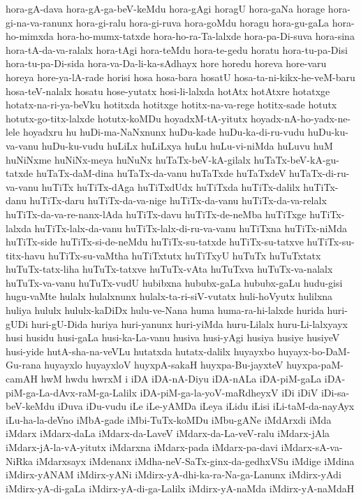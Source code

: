 {hora-gA-dava
hora-gA-ga-beV-keMdu
hora-gAgi
horagU
hora-gaNa
horage
hora-gi-na-va-ranunx
hora-gi-ralu
hora-gi-ruva
hora-goMdu
horagu
hora-gu-gaLa
hora-ho-mimxda
hora-ho-mumx-tatxde
hora-ho-ra-Ta-lalxde
hora-pa-Di-suva
hora-sina
hora-tA-da-va-ralalx
hora-tAgi
hora-teMdu
hora-te-gedu
horatu
hora-tu-pa-Disi
hora-tu-pa-Di-sida
hora-va-Da-li-ka-sAdhayx
hore
horedu
horeva
hore-varu
horeya
hore-ya-lA-rade
horisi
hosa
hosa-bara
hosatU
hosa-ta-ni-kikx-he-veM-baru
hosa-teV-nalalx
hosatu
hose-yutatx
hosi-li-lalxda
hotAtx
hotAtxre
hotatxge
hotatx-na-ri-ya-beVku
hotitxda
hotitxge
hotitx-na-va-rege
hotitx-sade
hotutx
hotutx-go-titx-lalxde
hotutx-koMDu
hoyadxM-tA-yitutx
hoyadx-nA-ho-yadx-ne-lele
hoyadxru
hu
huDi-ma-NaNxnunx
huDu-kade
huDu-ka-di-ru-vudu
huDu-ku-va-vanu
huDu-ku-vudu
huLiLx
huLiLxya
huLu
huLu-vi-niMda
huLuvu
huM
huNiNxme
huNiNx-meya
huNuNx
huTaTx-beV-kA-gilalx
huTaTx-beV-kA-gu-tatxde
huTaTx-daM-dina
huTaTx-da-vanu
huTaTxde
huTaTxdeV
huTaTx-di-ru-va-vanu
huTiTx
huTiTx-dAga
huTiTxdUdx
huTiTxda
huTiTx-dalilx
huTiTx-danu
huTiTx-daru
huTiTx-da-va-nige
huTiTx-da-vanu
huTiTx-da-va-relalx
huTiTx-da-va-re-nanx-lAda
huTiTx-davu
huTiTx-de-neMba
huTiTxge
huTiTx-lalxda
huTiTx-lalx-da-vanu
huTiTx-lalx-di-ru-va-vanu
huTiTxna
huTiTx-niMda
huTiTx-side
huTiTx-si-de-neMdu
huTiTx-su-tatxde
huTiTx-su-tatxve
huTiTx-su-titx-havu
huTiTx-su-vaMtha
huTiTxtutx
huTiTxyU
huTuTx
huTuTxtatx
huTuTx-tatx-liha
huTuTx-tatxve
huTuTx-vAta
huTuTxva
huTuTx-va-nalalx
huTuTx-va-vanu
huTuTx-vudU
hubibxna
hububx-gaLa
hububx-gaLu
hudu-gisi
hugu-vaMte
hulalx
hulalxnunx
hulalx-ta-ri-siV-vutatx
huli-hoVyutx
hulilxna
huliya
hululx
hululx-kaDiDx
hulu-ve-Nana
huma
huma-ra-hi-lalxde
hurida
huri-gUDi
huri-gU-Dida
huriya
huri-yanunx
huri-yiMda
huru-Lilalx
huru-Li-lalxyayx
husi
husidu
husi-gaLa
husi-ka-La-vanu
husiva
husi-yAgi
husiya
husiye
husiyeV
husi-yide
hutA-sha-na-veVLu
hutatxda
hutatx-dalilx
huyayxbo
huyayx-bo-DaM-Gu-rana
huyayxlo
huyayxloV
huyxpA-sakaH
huyxpa-Bu-jayxteV
huyxpa-paM-camAH
hwM
hwdu
hwrxM
i
iDA
iDA-nA-Diyu
iDA-nALa
iDA-piM-gaLa
iDA-piM-ga-La-dAvx-raM-ga-Lalilx
iDA-piM-ga-la-yoV-maRdheyxV
iDi
iDiV
iDi-sa-beV-keMdu
iDuva
iDu-vudu
iLe
iLe-yAMDa
iLeya
iLidu
iLisi
iLi-taM-da-nayAyx
iLu-ha-la-deVno
iMbA-gade
iMbi-TuTx-koMDu
iMbu-gANe
iMdArxdi
iMda
iMdarx
iMdarx-daLa
iMdarx-da-LaveV
iMdarx-da-La-veV-ralu
iMdarx-jAla
iMdarx-jA-la-vA-yitutx
iMdarxna
iMdarx-pada
iMdarx-pa-davi
iMdarx-sA-va-NiRka
iMdarxsayx
iMdenanx
iMdha-neV-SaTx-ginx-da-gedhxVSu
iMdige
iMdina
iMdirx-yANAM
iMdirx-yANi
iMdirx-yA-dhi-ka-ra-Na-ga-Lanunx
iMdirx-yAdi
iMdirx-yA-di-gaLa
iMdirx-yA-di-ga-Lalilx
iMdirx-yA-naMda
iMdirx-yA-naMdaH
}
